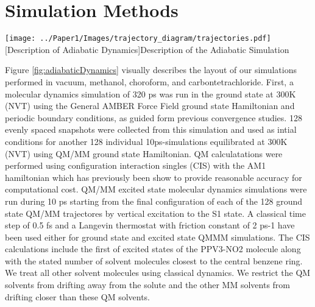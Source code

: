 \section{Simulation Methods}

\noindent
\begin{minipage}[c]{\textwidth}
  \centering
  \texttt{[image: ../Paper1/Images/trajectory\_diagram/trajectories.pdf]}
  [Description of Adiabatic Dynamics]{Description of the Adiabatic Simulation}
  \label{fig:adiabaticDynamics}
\end{minipage}\bigskip

Figure \ref{fig:adiabaticDynamics} visually describes the layout of our simulations performed in vacuum, methanol, choroform, and carbontetrachloride.
First, a molecular dynamics simulation of 320 ps was run in the ground state at 300K (NVT) using the General AMBER Force Field ground state Hamiltonian and periodic boundary conditions, as guided form previous convergence studies. \cite{silva2010benchmark}
128 evenly spaced snapshots were collected from this simulation and used as intial conditions for another 128 individual 10ps-simulations equilibrated at 300K (NVT) using QM/MM ground state Hamiltonian.
QM calculatations were performed using configuration interaction singles (CIS) with the AM1 hamiltonian which has previously been show to provide reasonable accuracy for computational cost. \cite{silva2010benchmark}
QM/MM excited state molecular dynamics simulations were run during 10 ps starting from the final configuration of each of the 128 ground state QM/MM trajectores by vertical excitation to the S1 state. \cite{nelson2012nonadiabatic}
A classical time step of 0.5 fs and a Langevin thermostat with friction constant of 2 ps-1 have been used either for ground state and excited state QMMM simulations. \cite{nelson2012nonadiabatic}
The CIS calculations include the first of excited states of the PPV3-NO2 molecule along with the stated number of solvent molecules closest to the central benzene ring.
We treat all other solvent molecules using classical dynamics.
We restrict the QM solvents from drifting away from the solute and the other MM solvents from drifting closer than these QM solvents.

